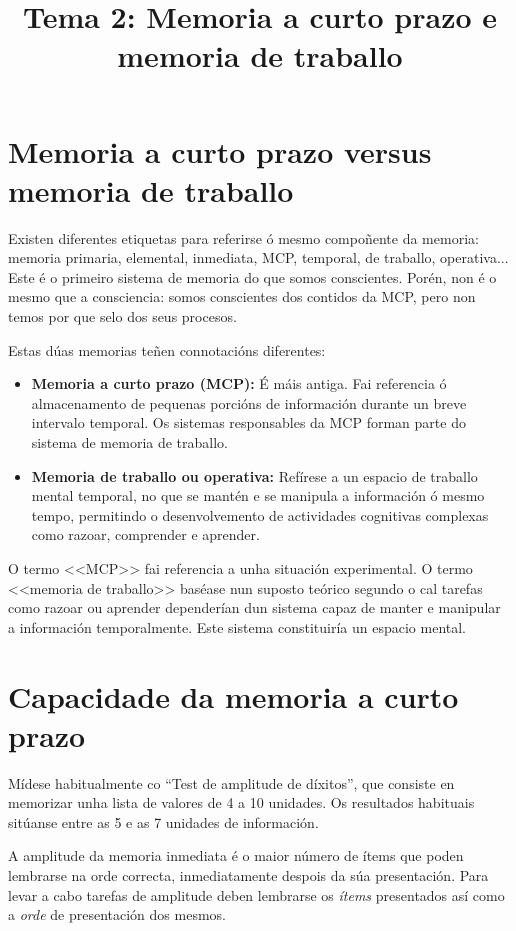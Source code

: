 \documentclass[a4paper,11pt]{article}
\title{Tema 2: Memoria a curto prazo e memoria de traballo}
\date{}
\begin{document}
  

\maketitle 

\section{Memoria a curto prazo versus memoria de traballo}
Existen diferentes etiquetas para referirse ó mesmo compoñente da memoria: memoria primaria, elemental, inmediata, MCP, temporal, de traballo, operativa... Este é o primeiro sistema de memoria do que somos conscientes. Porén, non é o mesmo que a consciencia: somos conscientes dos contidos da MCP, pero non temos por que selo dos seus procesos. 

Estas dúas memorias teñen connotacións diferentes:
\begin{itemize}
	\item \textbf{Memoria a curto prazo (MCP):} É máis antiga. Fai referencia ó almacenamento de
	pequenas porcións de información durante un breve intervalo temporal. Os sistemas responsables da 
	MCP forman parte do sistema de memoria de traballo.  
	\item \textbf{Memoria de traballo ou operativa:} Refírese a un espacio de traballo mental 				temporal, no que se mantén e se manipula a información ó mesmo tempo, permitindo o 						desenvolvemento de actividades cognitivas complexas como razoar, comprender e aprender.
\end{itemize}

O termo <<MCP>> fai referencia a unha situación experimental. O termo <<memoria de traballo>> baséase nun suposto teórico segundo o cal tarefas como razoar ou aprender dependerían dun sistema capaz de manter e manipular a información temporalmente. Este sistema constituiría un espacio mental.

\section{Capacidade da memoria a curto prazo}
Mídese habitualmente co ``Test de amplitude de díxitos'', que consiste en memorizar unha lista de valores de 4 a 10 unidades. Os resultados habituais sitúanse entre as 5 e as 7 unidades de información. 

A amplitude da memoria inmediata é o maior número de ítems que poden lembrarse na orde correcta, inmediatamente despois da súa presentación. Para levar a cabo tarefas de amplitude deben lembrarse os \textit{ítems} presentados así como a \textit{orde} de presentación dos mesmos. 
\end{document}

